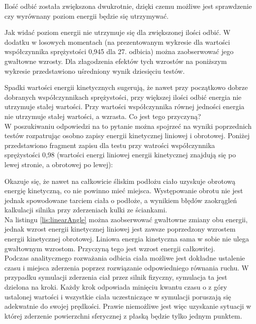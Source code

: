 
  
Ilość odbić została zwiększona dwukrotnie, dzięki czemu możliwe jest sprawdzenie
czy wyrównany poziom energii będzie się utrzymywać.
  


Jak widać poziom energii nie utrzymuje się dla zwiększonej ilości odbić. W
dodatku w losowych momentach (na prezentowanym wykresie dla wartości
współczynnika sprężystości 0,945 dla 27. odbicia) można zaobserwować jego
gwałtowne wzrosty. Dla złagodzenia efektów tych wzrostów na poniższym wykresie
przedstawiono uśredniony wynik dziesięciu testów.



Spadki wartości energii kinetycznych sugerują, że nawet przy początkowo dobrze
dobranych współczynnikach sprężystości, przy większej ilości odbić energia nie
utrzymuje stałej wartości. Przy wartości współczynnika równej jedności energia
nie utrzymuje stałej wartości, a wzrasta. Co jest tego przyczyną? \\
W poszukiwaniu odpowiedzi na to pytanie można spojrzeć na wyniki poprzednich
testów rozpatrując osobno zapisy energii kinetycznej liniowej i obrotowej.
Poniżej przedstawiono fragment zapisu dla testu przy watrości współczynnika
sprężystości 0,98 (wartości energi liniowej energii kinetycznej znajdują się
po lewej stronie, a obrotowej po lewej):



Okazuje się, że nawet na całkowicie śliskim podłożu ciało uzyskuje obrotową
energię kinetyczną, co nie powinno mieć miejsca. Występowanie obrotu nie jest
jednak spowodowane tarciem ciała o podłoże, a wynikiem błędów zaokrągleń
kalkulacji silnika przy zderzeniach kulki ze ściankami.\\
Na listingu \ref{lis:linearAngle} można zaobserwować gwałtowne zmiany obu
energii, jednak wzrost energii kinetycznej liniowej jest zawsze poprzedzony
wzrostem energii kinetycznej obrotowej. Liniowa energia kinetyczna sama w sobie
nie ulega gwałtownym wzrostom. Przyczyną tego jest wzrost energii całkowitej.\\
Podczas analitycznego rozważania odbicia ciała możliwe jest dokładne ustalenie
czasu i miejsca zderzenia poprzez rozwiązanie odpowiedniego równania ruchu. W
przypadku symulacji zderzenia ciał przez silnik fizyczny, symulacja ta jest
dzielona na kroki. Każdy krok odpowiada minięciu kwantu czasu o z góry ustalonej
wartości i wszystkie ciała uczestniczące w symulacji poruszają się adekwatnie do
swojej prędkości. Prawie niemożliwe jest więc uzyskanie sytuacji w której
zderzenie powierzchni sferycznej z płaską będzie tylko jednym punktem.

